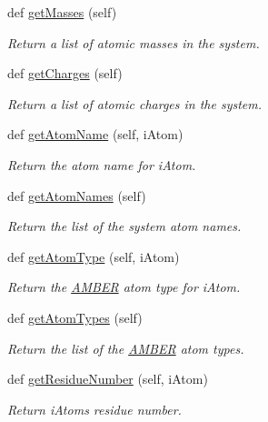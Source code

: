 \begin{DoxyCompactItemize}
def \hyperlink{classsrc_1_1amberio_1_1PrmtopLoader_a5692d84029e2fd6395a6438b1ae20437}{get\+Masses} (self)
\begin{DoxyCompactList}\small\item\em Return a list of atomic masses in the system. \end{DoxyCompactList}\item 
def \hyperlink{classsrc_1_1amberio_1_1PrmtopLoader_a7dae0918b1f2fb6c956c044198bba7a6}{get\+Charges} (self)
\begin{DoxyCompactList}\small\item\em Return a list of atomic charges in the system. \end{DoxyCompactList}\item 
def \hyperlink{classsrc_1_1amberio_1_1PrmtopLoader_aea4f3d9a8ea0133d6dbb40539ed00eee}{get\+Atom\+Name} (self, i\+Atom)
\begin{DoxyCompactList}\small\item\em Return the atom name for i\+Atom. \end{DoxyCompactList}\item 
def \hyperlink{classsrc_1_1amberio_1_1PrmtopLoader_ac95dc64ec362f33810c3a830675b3f8a}{get\+Atom\+Names} (self)
\begin{DoxyCompactList}\small\item\em Return the list of the system atom names. \end{DoxyCompactList}\item 
def \hyperlink{classsrc_1_1amberio_1_1PrmtopLoader_ab3640ff8568112edfc9d4b135e405ce7}{get\+Atom\+Type} (self, i\+Atom)
\begin{DoxyCompactList}\small\item\em Return the \hyperlink{classsrc_1_1amberio_1_1AMBER}{A\+M\+B\+ER} atom type for i\+Atom. \end{DoxyCompactList}\item 
def \hyperlink{classsrc_1_1amberio_1_1PrmtopLoader_a584354ca99dcfbd2de370e97cf121a6c}{get\+Atom\+Types} (self)
\begin{DoxyCompactList}\small\item\em Return the list of the \hyperlink{classsrc_1_1amberio_1_1AMBER}{A\+M\+B\+ER} atom types. \end{DoxyCompactList}\item 
def \hyperlink{classsrc_1_1amberio_1_1PrmtopLoader_a1c394f5a4a11ba80786832824b71d6a7}{get\+Residue\+Number} (self, i\+Atom)
\begin{DoxyCompactList}\small\item\em Return i\+Atom\textquotesingle{}s residue number. \end{DoxyCompactList}\item 

\end{DoxyCompactItemize}

